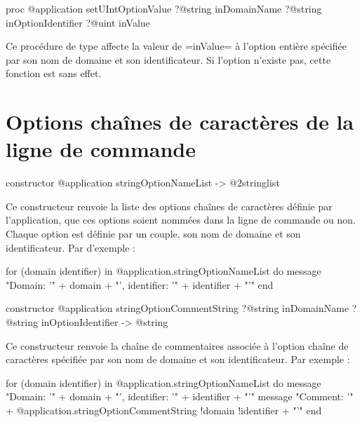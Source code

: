 \begin{galgas3box}
proc @application setUIntOptionValue
    ?@string inDomainName
    ?@string inOptionIdentifier
    ?@uint inValue
\end{galgas3box}

Ce procédure de type affecte la valeur de \ggst=inValue= à l'option entière spécifiée par son nom de domaine et son identificateur. Si l'option n'existe pas, cette fonction est sans effet.

















\section{Options chaînes de caractères de la ligne de commande}


\begin{galgas3box}
constructor @application stringOptionNameList -> @2stringlist
\end{galgas3box}

Ce constructeur renvoie la liste des options chaînes de caractères définie par l'application, que ces options soient nommées dans la ligne de commande ou non. Chaque option est définie par un couple, son nom de domaine et son identificateur. Par d'exemple :
\begin{galgas3}
for (domain identifier) in @application.stringOptionNameList do
  message "Domain: '" + domain + "', identifier: '" + identifier + "'\n"
end
\end{galgas3}



\begin{galgas3box}
constructor @application stringOptionCommentString
    ?@string inDomainName
    ?@string inOptionIdentifier -> @string
\end{galgas3box}

Ce constructeur renvoie la chaîne de commentaires associée à l'option chaîne de caractères spécifiée par son nom de domaine et son identificateur. Par exemple :
\begin{galgas3}
for (domain identifier) in @application.stringOptionNameList do
  message "Domain: '" + domain + "', identifier: '" + identifier + "'\n"
  message "Comment: '"
    + @application.stringOptionCommentString {!domain !identifier} + "'\n"
end
\end{galgas3}

